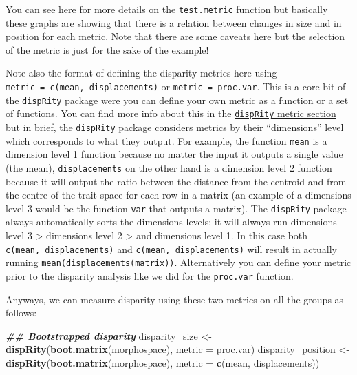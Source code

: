 \documentclass[
]{book}
\newenvironment{Shaded}{\begin{snugshade}}{\end{snugshade}}
\newcommand{\AttributeTok}[1]{\textcolor[rgb]{0.13,0.29,0.53}{#1}}
\newcommand{\DocumentationTok}[1]{\textcolor[rgb]{0.56,0.35,0.01}{\textbf{\textit{#1}}}}
\newcommand{\FunctionTok}[1]{\textcolor[rgb]{0.13,0.29,0.53}{\textbf{#1}}}
\newcommand{\NormalTok}[1]{#1}
\newcommand{\OtherTok}[1]{\textcolor[rgb]{0.56,0.35,0.01}{#1}}
\begin{document}
You can see \protect\hyperlink{test-metric}{here} for more details on the \texttt{test.metric} function but basically these graphs are showing that there is a relation between changes in size and in position for each metric.
Note that there are some caveats here but the selection of the metric is just for the sake of the example!

Note also the format of defining the disparity metrics here using \texttt{metric\ =\ c(mean,\ displacements)} or \texttt{metric\ =\ proc.var}. This is a core bit of the \texttt{dispRity} package were you can define your own metric as a function or a set of functions. You can find more info about this in the \protect\hyperlink{disparity-metrics}{\texttt{dispRity} metric section} but in brief, the \texttt{dispRity} package considers metrics by their ``dimensions'' level which corresponds to what they output. For example, the function \texttt{mean} is a dimension level 1 function because no matter the input it outputs a single value (the mean), \texttt{displacements} on the other hand is a dimension level 2 function because it will output the ratio between the distance from the centroid and from the centre of the trait space for each row in a matrix (an example of a dimensions level 3 would be the function \texttt{var} that outputs a matrix).
The \texttt{dispRity} package always automatically sorts the dimensions levels: it will always run dimensions level 3 \textgreater{} dimensions level 2 \textgreater{} and dimensions level 1. In this case both \texttt{c(mean,\ displacements)} and \texttt{c(mean,\ displacements)} will result in actually running \texttt{mean(displacements(matrix))}.
Alternatively you can define your metric prior to the disparity analysis like we did for the \texttt{proc.var} function.

Anyways, we can measure disparity using these two metrics on all the groups as follows:

\begin{Shaded}
\begin{Highlighting}[]
\DocumentationTok{\#\# Bootstrapped disparity}
\NormalTok{disparity\_size }\OtherTok{\textless{}{-}}  \FunctionTok{dispRity}\NormalTok{(}\FunctionTok{boot.matrix}\NormalTok{(morphospace), }\AttributeTok{metric =}\NormalTok{ proc.var)}
\NormalTok{disparity\_position }\OtherTok{\textless{}{-}} \FunctionTok{dispRity}\NormalTok{(}\FunctionTok{boot.matrix}\NormalTok{(morphospace), }\AttributeTok{metric =} \FunctionTok{c}\NormalTok{(mean, displacements))}
\end{Highlighting}
\end{Shaded}
\end{document}
